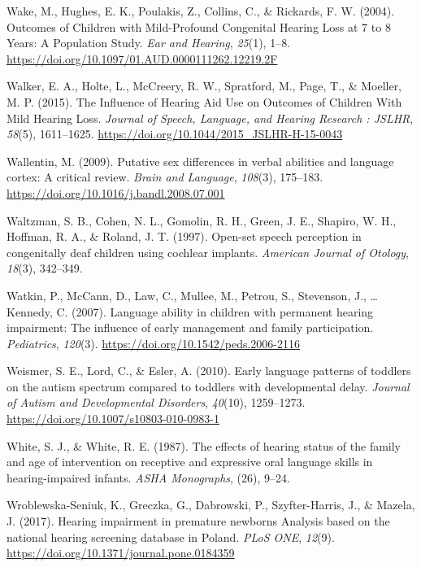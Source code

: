 \documentclass[english,man]{apa6}
\begin{document}
\leavevmode\hypertarget{ref-wake2004}{}%
Wake, M., Hughes, E. K., Poulakis, Z., Collins, C., \& Rickards, F. W. (2004). Outcomes of Children with Mild-Profound Congenital Hearing Loss at 7 to 8 Years: A Population Study. \emph{Ear and Hearing}, \emph{25}(1), 1--8. \url{https://doi.org/10.1097/01.AUD.0000111262.12219.2F}

\leavevmode\hypertarget{ref-walker2015}{}%
Walker, E. A., Holte, L., McCreery, R. W., Spratford, M., Page, T., \& Moeller, M. P. (2015). The Influence of Hearing Aid Use on Outcomes of Children With Mild Hearing Loss. \emph{Journal of Speech, Language, and Hearing Research : JSLHR}, \emph{58}(5), 1611--1625. \url{https://doi.org/10.1044/2015_JSLHR-H-15-0043}

\leavevmode\hypertarget{ref-wallentin2009}{}%
Wallentin, M. (2009). Putative sex differences in verbal abilities and language cortex: A critical review. \emph{Brain and Language}, \emph{108}(3), 175--183. \url{https://doi.org/10.1016/j.bandl.2008.07.001}

\leavevmode\hypertarget{ref-waltzman1997}{}%
Waltzman, S. B., Cohen, N. L., Gomolin, R. H., Green, J. E., Shapiro, W. H., Hoffman, R. A., \& Roland, J. T. (1997). Open-set speech perception in congenitally deaf children using cochlear implants. \emph{American Journal of Otology}, \emph{18}(3), 342--349.

\leavevmode\hypertarget{ref-watkin2007}{}%
Watkin, P., McCann, D., Law, C., Mullee, M., Petrou, S., Stevenson, J., \ldots{} Kennedy, C. (2007). Language ability in children with permanent hearing impairment: The influence of early management and family participation. \emph{Pediatrics}, \emph{120}(3). \url{https://doi.org/10.1542/peds.2006-2116}

\leavevmode\hypertarget{ref-weismer2010}{}%
Weismer, S. E., Lord, C., \& Esler, A. (2010). Early language patterns of toddlers on the autism spectrum compared to toddlers with developmental delay. \emph{Journal of Autism and Developmental Disorders}, \emph{40}(10), 1259--1273. \url{https://doi.org/10.1007/s10803-010-0983-1}

\leavevmode\hypertarget{ref-white1987}{}%
White, S. J., \& White, R. E. (1987). The effects of hearing status of the family and age of intervention on receptive and expressive oral language skills in hearing-impaired infants. \emph{ASHA Monographs}, (26), 9--24.

\leavevmode\hypertarget{ref-wroblewska-seniuk2017}{}%
Wroblewska-Seniuk, K., Greczka, G., Dabrowski, P., Szyfter-Harris, J., \& Mazela, J. (2017). Hearing impairment in premature newborns Analysis based on the national hearing screening database in Poland. \emph{PLoS ONE}, \emph{12}(9). \url{https://doi.org/10.1371/journal.pone.0184359}
\end{document}
